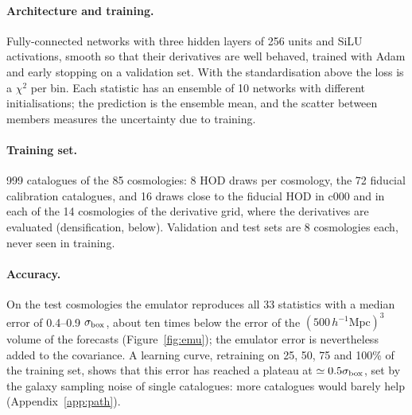 \documentclass[11pt,twocolumn]{article}
\newcommand{\Mpch}{\,h^{-1}\mathrm{Mpc}}
\begin{document}
\paragraph{Architecture and training.} Fully-connected networks with three hidden layers of 256 units and SiLU activations, smooth so that their derivatives are well behaved, trained with Adam and early stopping on a validation set. With the standardisation above the loss is a $\chi^2$ per bin. Each statistic has an ensemble of 10 networks with different initialisations; the prediction is the ensemble mean, and the scatter between members measures the uncertainty due to training.

\paragraph{Training set.} 999 catalogues of the 85 cosmologies: 8 HOD draws per cosmology, the 72 fiducial calibration catalogues, and 16 draws close to the fiducial HOD in c000 and in each of the 14 cosmologies of the derivative grid, where the derivatives are evaluated (densification, below). Validation and test sets are 8 cosmologies each, never seen in training.

\paragraph{Accuracy.} On the test cosmologies the emulator reproduces all 33 statistics with a median error of 0.4--0.9 $\sigma_{\rm box}$, about ten times below the error of the $(500\Mpch)^3$ volume of the forecasts (Figure~\ref{fig:emu}); the emulator error is nevertheless added to the covariance. A learning curve, retraining on 25, 50, 75 and 100\% of the training set, shows that this error has reached a plateau at $\simeq0.5\sigma_{\rm box}$, set by the galaxy sampling noise of single catalogues: more catalogues would barely help (Appendix~\ref{app:path}).
\end{document}
